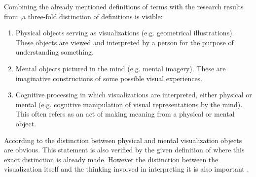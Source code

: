 Combining the already mentioned definitions of terms with the research results from \citeauthor{Phillips2010},a three-fold distinction of definitions is visible:
\begin{enumerate}
\item Physical objects serving as visualizations (e.g. geometrical illustrations). These objects are viewed and interpreted by a person for the purpose of understanding something.
\item Mental objects pictured in the mind (e.g. mental imagery). These are imaginative constructions of some possible visual experiences.
\item Cognitive processing in which visualizations are interpreted, either physical or mental (e.g. cognitive manipulation of visual representations by the mind). This often refers as an act of making meaning from a physical or mental object.
\end{enumerate}

According to \citeauthor{Phillips2010} the distinction between physical and mental visualization objects are obvious. This statement is also verified by the given definition of \citeauthor{mccormick:1987} where this exact distinction is already made. However the distinction between the visualization itself and the thinking involved in interpreting it is also important .